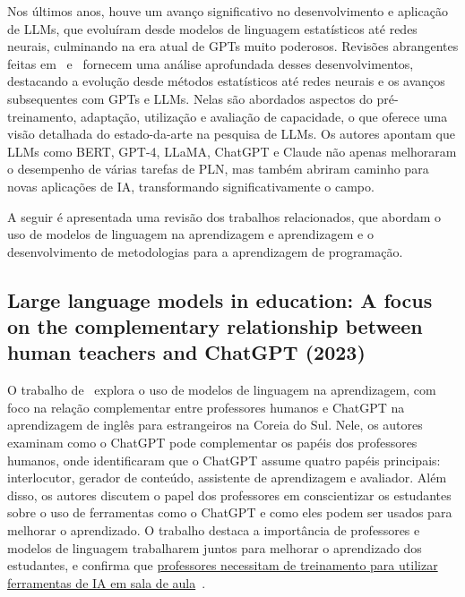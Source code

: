 \documentclass[journal]{IEEEtran}
\begin{document}
\noindent%
Nos últimos anos, houve um avanço significativo no desenvolvimento e aplicação de LLMs,
que evoluíram desde modelos de linguagem estatísticos até redes neurais, culminando na era atual de GPTs muito poderosos.
Revisões abrangentes feitas em~\cite{bommasani2021opportunities} e~\cite{zhao2023survey} fornecem uma análise aprofundada desses desenvolvimentos, destacando a evolução desde métodos estatísticos até redes neurais e os avanços subsequentes com GPTs e LLMs.
Nelas são abordados aspectos do pré-treinamento, adaptação, utilização e avaliação de capacidade, o que oferece uma visão detalhada do estado-da-arte na pesquisa de LLMs.
Os autores apontam que LLMs como BERT, GPT-4, LLaMA, ChatGPT e Claude não apenas melhoraram o desempenho de várias tarefas de PLN, mas também abriram caminho para novas aplicações de IA, transformando significativamente o campo.

A seguir é apresentada uma revisão dos trabalhos relacionados, que abordam o uso de modelos de linguagem na aprendizagem e aprendizagem e o desenvolvimento de metodologias para a aprendizagem de programação.

\subsection{Large language models in education: A focus on the complementary relationship between human teachers and ChatGPT (2023)}
\noindent%
O trabalho de~\cite{jeon2023large} explora o uso de modelos de linguagem na aprendizagem, com foco na relação complementar entre professores humanos e ChatGPT na aprendizagem de inglês para estrangeiros na Coreia do Sul.
Nele, os autores examinam como o ChatGPT pode complementar os papéis dos professores humanos, onde identificaram que o ChatGPT assume quatro papéis principais: interlocutor, gerador de conteúdo, assistente de aprendizagem e avaliador.
Além disso, os autores discutem o papel dos professores em conscientizar os estudantes sobre o uso de ferramentas como o ChatGPT e como eles podem ser usados para melhorar o aprendizado.
O trabalho destaca a importância de professores e modelos de linguagem trabalharem juntos para melhorar o aprendizado dos estudantes, e confirma que \ul{professores necessitam de treinamento para utilizar ferramentas de IA em sala de aula}~\cite{jeon2023large,celik2022promises}.
\end{document}
